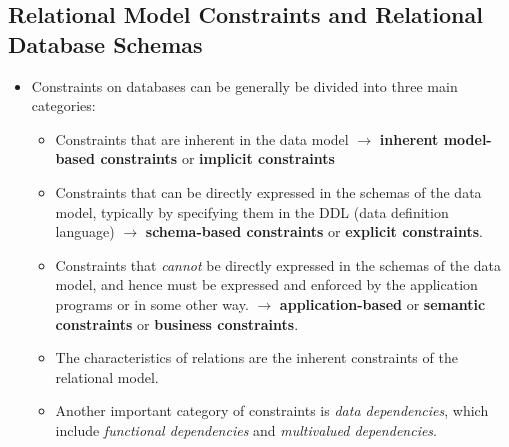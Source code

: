 \documentclass[10pt]{article}
\begin{document}
\subsection{Relational Model Constraints and Relational Database Schemas}

\begin{itemize}
	\item Constraints on databases can be generally be divided into three main categories:
	\begin{itemize}
		\item Constraints that are inherent in the data model $\rightarrow$ \textbf{inherent model-based constraints} or \textbf{implicit constraints}
		\item Constraints that can be directly expressed in the schemas of the data model, typically by specifying them in the DDL (data definition language) $\rightarrow$ \textbf{schema-based constraints} or \textbf{explicit constraints}.
		\item Constraints that \textit{cannot} be directly expressed in the schemas of the data model, and hence must be expressed and enforced by the application programs or in some other way. $\rightarrow$ \textbf{application-based} or \textbf{semantic constraints} or \textbf{business constraints}.

		\item The characteristics of relations are the inherent constraints of the relational model.
		\item Another important category of constraints is \textit{data dependencies}, which include \textit{functional dependencies} and \textit{multivalued dependencies}.
	\end{itemize}
\end{itemize}
\end{document}
